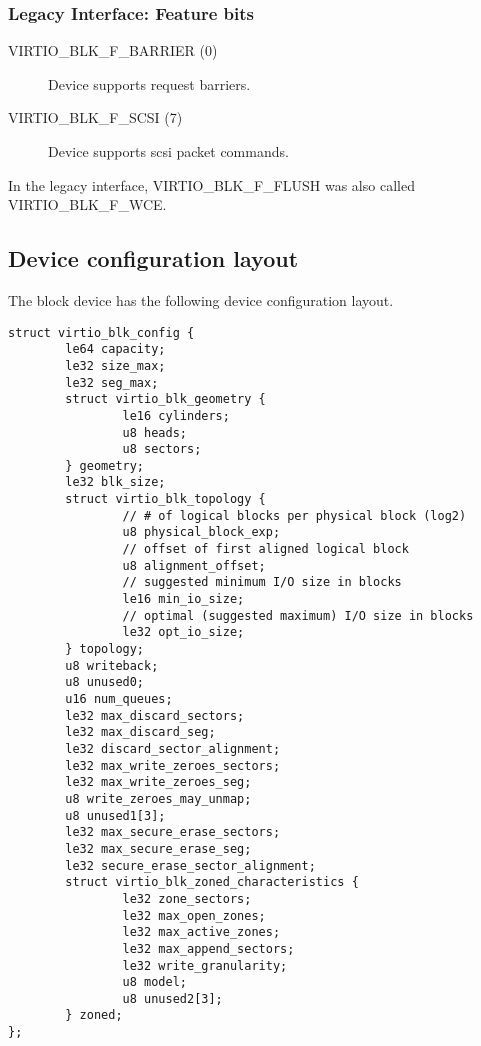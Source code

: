 \subsubsection{Legacy Interface: Feature bits}\label{sec:Device Types / Block Device / Feature bits / Legacy Interface: Feature bits}

\begin{description}
\item[VIRTIO_BLK_F_BARRIER (0)] Device supports request barriers.

\item[VIRTIO_BLK_F_SCSI (7)] Device supports scsi packet commands.
\end{description}

\begin{note}
  In the legacy interface, VIRTIO_BLK_F_FLUSH was also
  called VIRTIO_BLK_F_WCE.
\end{note}

\subsection{Device configuration layout}\label{sec:Device Types / Block Device / Device configuration layout}

The block device has the following device configuration layout.

\begin{lstlisting}
struct virtio_blk_config {
        le64 capacity;
        le32 size_max;
        le32 seg_max;
        struct virtio_blk_geometry {
                le16 cylinders;
                u8 heads;
                u8 sectors;
        } geometry;
        le32 blk_size;
        struct virtio_blk_topology {
                // # of logical blocks per physical block (log2)
                u8 physical_block_exp;
                // offset of first aligned logical block
                u8 alignment_offset;
                // suggested minimum I/O size in blocks
                le16 min_io_size;
                // optimal (suggested maximum) I/O size in blocks
                le32 opt_io_size;
        } topology;
        u8 writeback;
        u8 unused0;
        u16 num_queues;
        le32 max_discard_sectors;
        le32 max_discard_seg;
        le32 discard_sector_alignment;
        le32 max_write_zeroes_sectors;
        le32 max_write_zeroes_seg;
        u8 write_zeroes_may_unmap;
        u8 unused1[3];
        le32 max_secure_erase_sectors;
        le32 max_secure_erase_seg;
        le32 secure_erase_sector_alignment;
        struct virtio_blk_zoned_characteristics {
                le32 zone_sectors;
                le32 max_open_zones;
                le32 max_active_zones;
                le32 max_append_sectors;
                le32 write_granularity;
                u8 model;
                u8 unused2[3];
        } zoned;
};
\end{lstlisting}

